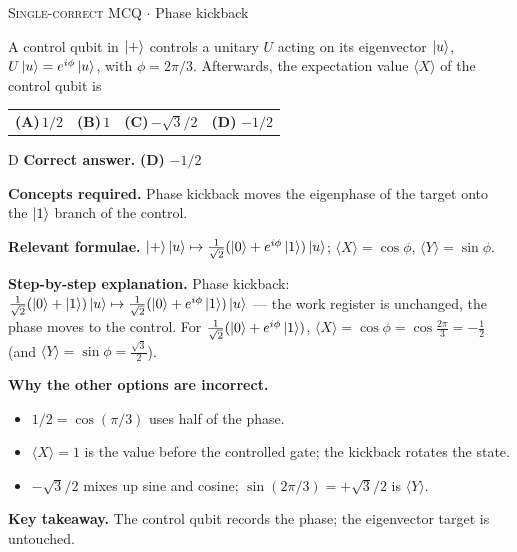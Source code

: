 \documentclass[11pt,a4paper]{article}
\newcommand{\optlabel}[1]{\textbf{(#1)}}
\newcommand{\correctlabel}[1]{\textcolor{okgreen}{\textbf{(#1)}\,\ding{51}}}
\newenvironment{qitem}[1]{\begin{list}{}{\setlength{\leftmargin}{3.3em}\setlength{\labelwidth}{3.1em}%
  \setlength{\labelsep}{0.2em}\setlength{\topsep}{3pt}\setlength{\parsep}{3pt}}\item[\textbf{Q.#1}\hfill]}{\end{list}}
\newcommand{\qsep}{\par\vspace{2pt}{\color{black!15}\hrule}\vspace{4pt}}
\newcommand{\qmeta}[2]{{\footnotesize\color{black!60}\textsc{#1} \;$\cdot$\; #2}\par}
\begin{document}
\begin{qitem}{26}
\qmeta{Single-correct MCQ}{Phase kickback}
A control qubit in $\ket+$ controls a unitary $U$ acting on its eigenvector $\ket u$, $U\ket u = e^{i\phi}\ket u$, with $\phi = 2\pi/3$. Afterwards, the
expectation value $\langle X\rangle$ of the control qubit is
\par\smallskip\noindent\begin{tabularx}{\linewidth}{@{}*{4}{L}@{}}
\optlabel{A}\,$1/2$ & \optlabel{B}\,$1$ & \optlabel{C}\,$-\sqrt3/2$ & \correctlabel{D}\,$-1/2$
\end{tabularx}
\end{qitem}
\begin{solbox}{D}
\textbf{\color{brand}Correct answer.} \textcolor{okgreen}{\textbf{(D)}} $-1/2$

\textbf{\color{brand}Concepts required.} Phase kickback moves the eigenphase of the target onto the $\ket1$ branch of the control.

\textbf{\color{brand}Relevant formulae.} $\ket+\ket u \mapsto \frac{1}{\sqrt2}(\ket0 + e^{i\phi}\ket1)\ket u$; $\langle X\rangle = \cos\phi$, $\langle Y\rangle = \sin\phi$.

\textbf{\color{brand}Step-by-step explanation.} Phase kickback: $\frac{1}{\sqrt2}(\ket0 + \ket1)\ket u \mapsto \frac{1}{\sqrt2}(\ket0 + e^{i\phi}\ket1)\ket u$ --- the work register is unchanged, the phase moves to
the control. For $\frac{1}{\sqrt2}(\ket0 + e^{i\phi}\ket1)$, $\langle X\rangle = \cos\phi = \cos\frac{2\pi}{3} = -\frac12$ (and $\langle Y\rangle = \sin\phi = \frac{\sqrt3}{2}$).

\textbf{\color{brand}Why the other options are incorrect.}
\begin{itemize}[leftmargin=2.4em, itemsep=1pt, topsep=2pt]
\item[\textbf{(A)}] $1/2 = \cos(\pi/3)$ uses half of the phase.
\item[\textbf{(B)}] $\langle X\rangle = 1$ is the value before the controlled gate; the kickback rotates the state.
\item[\textbf{(C)}] $-\sqrt3/2$ mixes up sine and cosine; $\sin(2\pi/3) = +\sqrt3/2$ is $\langle Y\rangle$.
\end{itemize}
\textbf{\color{brand}Key takeaway.} The control qubit records the phase; the eigenvector target is untouched.
\end{solbox}
\qsep
\end{document}
